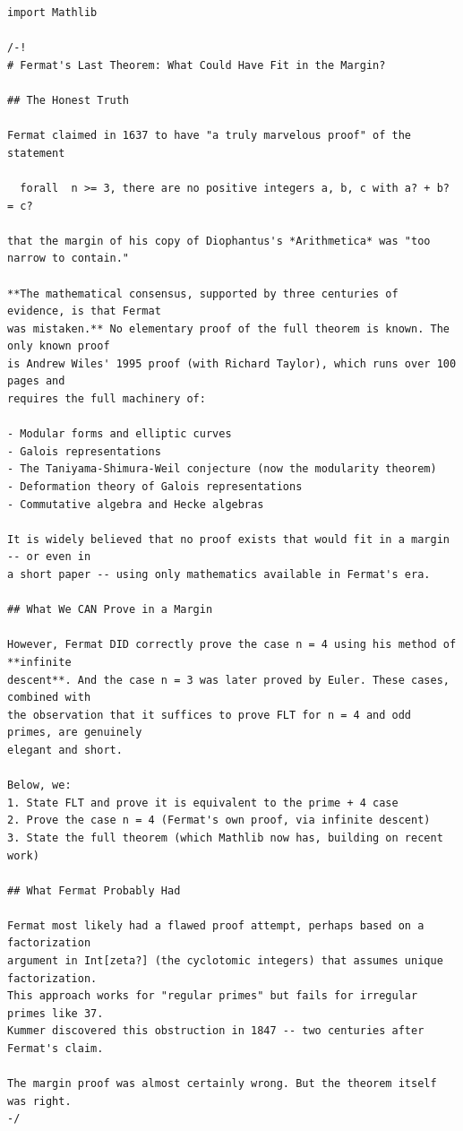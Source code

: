 \documentclass[11pt,twoside,openright]{book}
\theoremstyle{definition}
\theoremstyle{remark}
\begin{document}
\begin{lstlisting}[style=lean]
import Mathlib

/-!
# Fermat's Last Theorem: What Could Have Fit in the Margin?

## The Honest Truth

Fermat claimed in 1637 to have "a truly marvelous proof" of the statement

  forall  n >= 3, there are no positive integers a, b, c with a? + b? = c?

that the margin of his copy of Diophantus's *Arithmetica* was "too narrow to contain."

**The mathematical consensus, supported by three centuries of evidence, is that Fermat
was mistaken.** No elementary proof of the full theorem is known. The only known proof
is Andrew Wiles' 1995 proof (with Richard Taylor), which runs over 100 pages and
requires the full machinery of:

- Modular forms and elliptic curves
- Galois representations
- The Taniyama-Shimura-Weil conjecture (now the modularity theorem)
- Deformation theory of Galois representations
- Commutative algebra and Hecke algebras

It is widely believed that no proof exists that would fit in a margin -- or even in
a short paper -- using only mathematics available in Fermat's era.

## What We CAN Prove in a Margin

However, Fermat DID correctly prove the case n = 4 using his method of **infinite
descent**. And the case n = 3 was later proved by Euler. These cases, combined with
the observation that it suffices to prove FLT for n = 4 and odd primes, are genuinely
elegant and short.

Below, we:
1. State FLT and prove it is equivalent to the prime + 4 case
2. Prove the case n = 4 (Fermat's own proof, via infinite descent)
3. State the full theorem (which Mathlib now has, building on recent work)

## What Fermat Probably Had

Fermat most likely had a flawed proof attempt, perhaps based on a factorization
argument in Int[zeta?] (the cyclotomic integers) that assumes unique factorization.
This approach works for "regular primes" but fails for irregular primes like 37.
Kummer discovered this obstruction in 1847 -- two centuries after Fermat's claim.

The margin proof was almost certainly wrong. But the theorem itself was right.
-/


\end{lstlisting}
\end{document}
